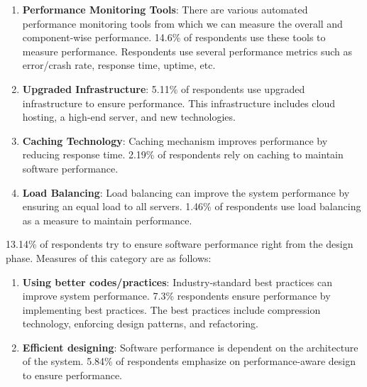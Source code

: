 \begin{enumerate}[label=(\alph*)]
    \item \textbf{Performance Monitoring Tools}: There are various automated performance monitoring tools from which we can measure the overall and component-wise performance. 14.6\% of respondents use these tools to measure performance. Respondents use several performance metrics such as error/crash rate, response time, uptime, etc.
    
    \item \textbf{Upgraded Infrastructure}: 5.11\% of respondents use upgraded infrastructure to ensure performance. This infrastructure includes cloud hosting, a high-end server, and new technologies.
    
    \item \textbf{Caching Technology}: Caching mechanism improves performance by reducing response time. 2.19\% of respondents rely on caching to maintain software performance.
    
    \item \textbf{Load Balancing}: Load balancing can improve the system performance by ensuring an equal load to all servers. 1.46\% of respondents use load balancing as a measure to maintain performance.

\end{enumerate}


13.14\% of respondents try to ensure software performance right from the design phase. Measures of this category are as follows:

\begin{enumerate}[label=(\alph*)]

    \item \textbf{Using better codes/practices}: Industry-standard best practices can improve system performance. 7.3\% respondents ensure performance by implementing best practices. The best practices include compression technology, enforcing design patterns, and refactoring.
    
    \item \textbf{Efficient designing}: Software performance is dependent on the architecture of the system. 5.84\% of respondents emphasize on performance-aware design to ensure performance.

\end{enumerate}

